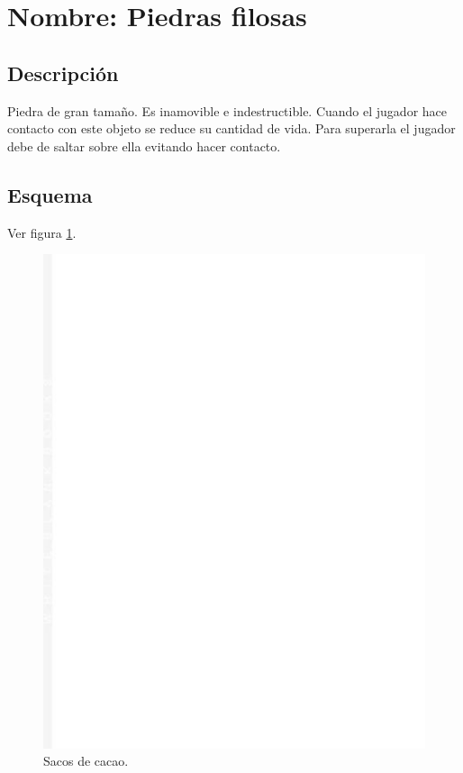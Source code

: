 		\section{Nombre: Piedras filosas}\label{obs.piedrasF}
	\subsection{Descripción}
	Piedra de gran tamaño. Es inamovible e indestructible. Cuando el jugador hace contacto con este objeto se reduce su cantidad de vida. Para superarla el jugador debe de saltar sobre ella evitando hacer contacto.
	\subsection{Esquema}
	Ver figura \ref{fig:piedrasF}.
	\begin{figure}
		\centering
		\includegraphics[height=0.2 \textheight]{Imagenes/piedrasF}
		\caption{Sacos de cacao.}
		\label{fig:piedrasF}
	\end{figure}